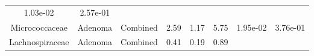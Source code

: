 \documentclass[12pt,]{article}
\begin{document}
\begin{longtable}[]{@{}cccccccc@{}}
\begin{minipage}[t]{0.06\columnwidth}
1.03e-02\strut
\end{minipage} & \begin{minipage}[t]{0.06\columnwidth}\centering\strut
2.57e-01\strut
\end{minipage}\tabularnewline
\begin{minipage}[t]{0.19\columnwidth}\centering\strut
Micrococcaceae\strut
\end{minipage} & \begin{minipage}[t]{0.07\columnwidth}\centering\strut
Adenoma\strut
\end{minipage} & \begin{minipage}[t]{0.09\columnwidth}\centering\strut
Combined\strut
\end{minipage} & \begin{minipage}[t]{0.03\columnwidth}\centering\strut
2.59\strut
\end{minipage} & \begin{minipage}[t]{0.14\columnwidth}\centering\strut
1.17\strut
\end{minipage} & \begin{minipage}[t]{0.14\columnwidth}\centering\strut
5.75\strut
\end{minipage} & \begin{minipage}[t]{0.06\columnwidth}\centering\strut
1.95e-02\strut
\end{minipage} & \begin{minipage}[t]{0.06\columnwidth}\centering\strut
3.76e-01\strut
\end{minipage}\tabularnewline
\begin{minipage}[t]{0.19\columnwidth}\centering\strut
Lachnospiraceae\strut
\end{minipage} & \begin{minipage}[t]{0.07\columnwidth}\centering\strut
Adenoma\strut
\end{minipage} & \begin{minipage}[t]{0.09\columnwidth}\centering\strut
Combined\strut
\end{minipage} & \begin{minipage}[t]{0.03\columnwidth}\centering\strut
0.41\strut
\end{minipage} & \begin{minipage}[t]{0.14\columnwidth}\centering\strut
0.19\strut
\end{minipage} & \begin{minipage}[t]{0.14\columnwidth}\centering\strut
0.89\strut
\end{minipage} & \begin{minipage}[t]{0.06\columnwidth}\centering\strut

\end{minipage}
\end{longtable}
\end{document}
